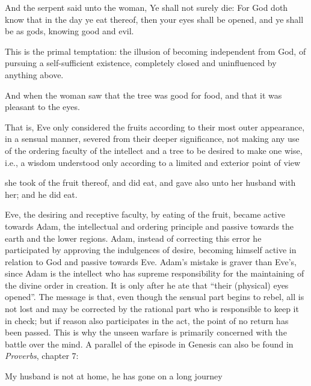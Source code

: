 \begin{quotex}
And the serpent said unto the woman, Ye shall not surely die: For God doth know that in the day ye eat thereof, then your eyes shall be opened, and ye shall be as gods, knowing good and evil.
\end{quotex}


This is the primal temptation: the illusion of becoming independent from God, of pursuing a self-sufficient existence, completely closed and uninfluenced by anything above.

\begin{quotex}
And when the woman saw that the tree was good for food, and that it was pleasant to the eyes.
\end{quotex}


That is, Eve only considered the fruits according to their most outer appearance, in a sensual manner, severed from their deeper significance, not making any use of the ordering faculty of the intellect and a tree to be desired to make one wise, i.e., a wisdom understood only according to a limited and exterior point of view

\begin{quotex}
she took of the fruit thereof, and did eat, and gave also unto her husband with her; and he did eat.
\end{quotex}


Eve, the desiring and receptive faculty, by eating of the fruit, became active towards Adam, the intellectual and ordering principle and passive towards the earth and the lower regions. Adam, instead of correcting this error he participated by approving the indulgences of desire, becoming himself active in relation to God and passive towards Eve. Adam's mistake is graver than Eve's, since Adam is the intellect who has supreme responsibility for the maintaining of the divine order in creation. It is only after he ate that ``their (physical) eyes opened''. The message is that, even though the sensual part begins to rebel, all is not lost and may be corrected by the rational part who is responsible to keep it in check; but if reason also participates in the act, the point of no return has been passed. This is why the unseen warfare is primarily concerned with the battle over the mind. A parallel of the episode in Genesis can also be found in \emph{Proverbs}, chapter 7:

\begin{quotex}
My husband is not at home, he has gone on a long journey
\end{quotex}


